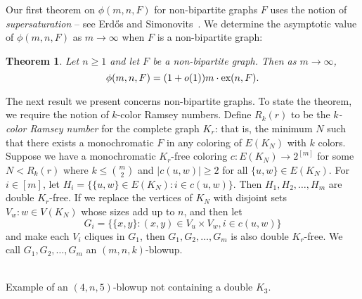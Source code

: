 \documentclass[12pt]{article}
\newtheorem{theorem}{Theorem}
\newcommand*{\ex}{\textnormal{ex}}
\begin{document}
Our first theorem on $\phi(m, n, F)$ for non-bipartite graphs $F$ uses the notion of \textit{supersaturation} -- see Erd\H{o}s and Simonovits~\cite{ErdosSimonovits1983}. We determine the asymptotic value of $\phi(m, n, F)$ as $m \rightarrow \infty$ when $F$ is a non-bipartite graph:

\begin{theorem}\label{thm:asymp}
  Let $n \geq 1$ and let $F$ be a non-bipartite graph. Then as $m \rightarrow \infty$, 
  \[
    \phi(m, n, F) = (1 + o(1))m \cdot \ex(n, F).
  \]
\end{theorem}

The next result we present concerns non-bipartite graphs. To state the theorem, we require the notion of $k$-color Ramsey numbers. Define $R_k(r)$ to be the \textit{$k$-color Ramsey number} for the complete graph $K_r$: that is, the minimum $N$ such that there exists a monochromatic $F$ in any coloring of $E(K_N)$ with $k$ colors. Suppose we have a monochromatic $K_r$-free coloring $c : E(K_N) \rightarrow 2^{[m]}$ for some $N < R_k(r)$ where $k \leq \binom{m}{2}$ and $|c(u, w)| \geq 2$ for all $\{u, w\} \in E(K_N)$. For $i \in [m]$, let $H_i = \{\{u, w\} \in E(K_N) : i \in c(u, w)\}$. Then $H_1,H_2,\dots,H_m$ are double $K_r$-free. If we replace the vertices of $K_N$ with disjoint sets $V_w : w \in V(K_N)$ whose sizes add up to $n$, and then let
\[ 
  G_i = \{\{x,y\} : (x,y) \in V_u \times V_w, i \in c(u,w)\} 
\] 
and make each $V_i$ cliques in $G_1$, then $G_1, G_2, \dots, G_m$ is also double $K_r$-free. We call $G_1, G_2, \dots, G_m$ an $(m, n, k)$-blowup. 

\begin{center}
  \\
  \small{Example of an $(4, n, 5)$-blowup not containing a double $K_3$.}
\end{center}
\end{document}
